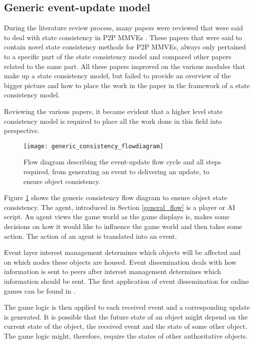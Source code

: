\subsection{Generic event-update model}

During the literature review process, many papers were reviewed that were said to deal with state consistency in P2P MMVEs \cite{}. These papers that were said to contain novel state consistency methods for P2P MMVEs, always only pertained to a specific part of the state consistency model and compared other papers related to the same part. All these papers improved on the various modules that make up a state consistency model, but failed to provide an overview of the bigger picture and how to place the work in the paper in the framework of a state consistency model.

Reviewing the various papers, it became evident that a higher level state consistency model is required to place all the work done in this field into perspective.

\begin{figure}[htbp]
 \centering
 \texttt{[image: generic\_consistency\_flowdiagram]}
 \caption{Flow diagram describing the event-update flow cycle and all steps required, from generating an event to delivering an update, to ensure object consistency.}
 \label{fig_event_update_flowdiagram}
\end{figure}

Figure \ref{fig_event_update_flowdiagram} shows the generic consistency flow diagram to ensure object state consistency. The agent, introduced in Section \ref{general_flow} is a player or AI script. An agent views the game world as the game displays is, makes some decisions on how it would like to influence the game world and then takes some action. The action of an agent is translated into an event.

Event layer interest management determines which objects will be affected and on which nodes these objects are housed. Event dissemination deals with how information is sent to peers after interest management determines which information should be sent. The first application of event dissemination for online games can be found in \cite{first_GED}.

The game logic is then applied to each received event and a corresponding update is generated. It is possible that the future state of an object might depend on the current state of the object, the received event and the state of some other object. The game logic might, therefore, require the states of other authoritative objects.

